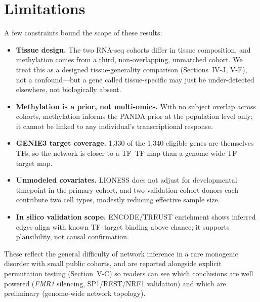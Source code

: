 \documentclass[journal]{IEEEtran}
\newcommand{\gene}[1]{\textit{#1}}
\begin{document}
\section{Limitations}
A few constraints bound the scope of these results:
\begin{itemize}
\item \textbf{Tissue design.} The two RNA-seq cohorts differ in tissue composition, and methylation comes from a third, non-overlapping, unmatched cohort. We treat this as a designed tissue-generality comparison (Sections~IV-J, V-F), not a confound---but a gene called tissue-specific may just be under-detected elsewhere, not biologically absent.
\item \textbf{Methylation is a prior, not multi-omics.} With no subject overlap across cohorts, methylation informs the PANDA prior at the population level only; it cannot be linked to any individual's transcriptional response.
\item \textbf{GENIE3 target coverage.} 1,330 of the 1,340 eligible genes are themselves TFs, so the network is closer to a TF--TF map than a genome-wide TF--target map.
\item \textbf{Unmodeled covariates.} LIONESS does not adjust for developmental timepoint in the primary cohort, and two validation-cohort donors each contribute two cell types, modestly reducing effective sample size.
\item \textbf{In silico validation scope.} ENCODE/TRRUST enrichment shows inferred edges align with known TF--target binding above chance; it supports plausibility, not causal confirmation.
\end{itemize}
These reflect the general difficulty of network inference in a rare monogenic disorder with small public cohorts, and are reported alongside explicit permutation testing (Section~V-C) so readers can see which conclusions are well powered (\gene{FMR1} silencing, SP1/REST/NRF1 validation) and which are preliminary (genome-wide network topology).
\end{document}
